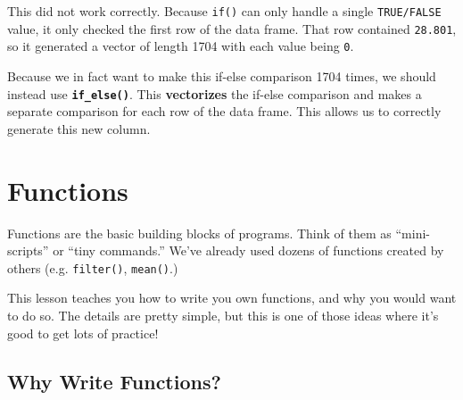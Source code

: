 \documentclass[]{book}
\newenvironment{Shaded}{\begin{snugshade}}{\end{snugshade}}
\newcommand{\CommentTok}[1]{\textcolor[rgb]{0.56,0.35,0.01}{\textit{#1}}}
\newcommand{\DataTypeTok}[1]{\textcolor[rgb]{0.13,0.29,0.53}{#1}}
\newcommand{\DecValTok}[1]{\textcolor[rgb]{0.00,0.00,0.81}{#1}}
\newcommand{\KeywordTok}[1]{\textcolor[rgb]{0.13,0.29,0.53}{\textbf{#1}}}
\newcommand{\NormalTok}[1]{#1}
\newcommand{\OperatorTok}[1]{\textcolor[rgb]{0.81,0.36,0.00}{\textbf{#1}}}
\newcommand{\StringTok}[1]{\textcolor[rgb]{0.31,0.60,0.02}{#1}}
\begin{document}
This did not work correctly. Because \texttt{if()} can only handle a single \texttt{TRUE/FALSE} value, it only checked the first row of the data frame. That row contained \texttt{28.801}, so it generated a vector of length 1704 with each value being \texttt{0}.

Because we in fact want to make this if-else comparison 1704 times, we should instead use \textbf{\texttt{if\_else()}}. This \textbf{vectorizes} the if-else comparison and makes a separate comparison for each row of the data frame. This allows us to correctly generate this new column.

\begin{Shaded}
\end{Shaded}

\hypertarget{functions-1}{%
\section{Functions}\label{functions-1}}

Functions are the basic building blocks of programs. Think of them as ``mini-scripts'' or ``tiny commands.'' We've already used dozens of functions created by others (e.g. \texttt{filter()}, \texttt{mean()}.)

This lesson teaches you how to write you own functions, and why you would want to do so. The details are pretty simple, but this is one of those ideas where it's good to get lots of practice!

\hypertarget{why-write-functions}{%
\subsection{Why Write Functions?}\label{why-write-functions}}
\end{document}
